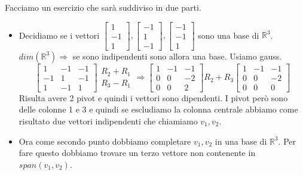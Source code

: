 \begin{example}
Facciamo un esercizio che sarà suddiviso in due parti.
\begin{itemize}
    \item Decidiamo se i vettori $\begin{bmatrix}1\\-1\\1\end{bmatrix}, \begin{bmatrix}-1\\1\\-1\end{bmatrix}, \begin{bmatrix}-1\\-1\\1\end{bmatrix}$ sono una base di $\mathbb{R}^3$. $dim(\mathbb{R}^3) \Longrightarrow$ se sono indipendenti sono allora una base. Usiamo gauss.
    \[
    \begin{bmatrix}
    1 & -1 & -1\\
    -1 & 1 & -1 \\
    1 & -1 & 1
    \end{bmatrix}
    \begin{array}{l}
        R_2 + R_1\\
        R_3 - R_1
    \end{array}
    \Rightarrow
    \begin{bmatrix}
    1 & -1 & -1\\
    0 & 0 & -2 \\
    0 & 0 & 2
    \end{bmatrix}
    R_2 + R_3
    \begin{bmatrix}
    1 & -1 & -1\\
    0 & 0 & -2 \\
    0 & 0 & 0
    \end{bmatrix}
    \]
    Risulta avere 2 pivot e quindi i vettori sono dipendenti. I pivot però sono delle colonne 1 e 3 e quindi se escludiamo la colonna centrale abbiamo come risultato due vettori indipendenti che chiamiamo $v_1, v_2$.
    \item Ora come secondo punto dobbiamo completare $v_1, v_2$ in una base di $\mathbb{R}^3$. Per fare questo dobbiamo trovare un terzo vettore non contenente in $span(v_1, v_2)$.\\

\end{itemize}
\end{example}
